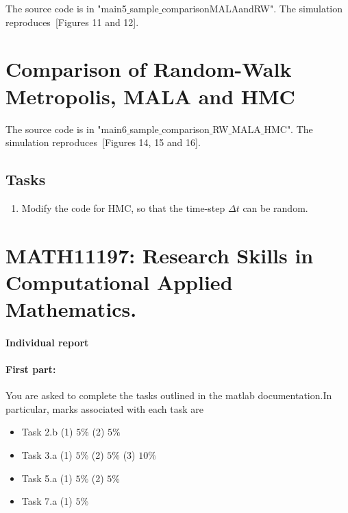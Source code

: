\documentclass{scrartcl}
\begin{document}
The source code is in "main5$\_$sample$\_$comparisonMALAandRW". The simulation reproduces~\cite{sanz2014markov}[Figures 11 and 12]. 

\section{Comparison of Random-Walk Metropolis, MALA and HMC}

The source code is in "main6$\_$sample$\_$comparison$\_$RW$\_$MALA$\_$HMC". The simulation reproduces~\cite{sanz2014markov}[Figures 14, 15 and 16]. 

\subsection{Tasks}
\begin{enumerate}
\item Modify the code for HMC, so that the time-step $\Delta t$ can be random.
\end{enumerate}







\newpage

\section*{MATH11197: Research Skills in Computational Applied Mathematics. }

\paragraph{Individual report}


\paragraph{First part:} You are asked to complete the tasks outlined in the matlab documentation.In particular, marks associated with each task are
\begin{itemize}
\item Task 2.b (1) $5\%$ (2) $5\%$
\item Task 3.a (1) $5\%$ (2) $5\%$  (3) $10 \%$
\item Task 5.a (1) $5\%$ (2) $5\%$
\item Task 7.a (1) $5\%$
\end{itemize}
\end{document}
